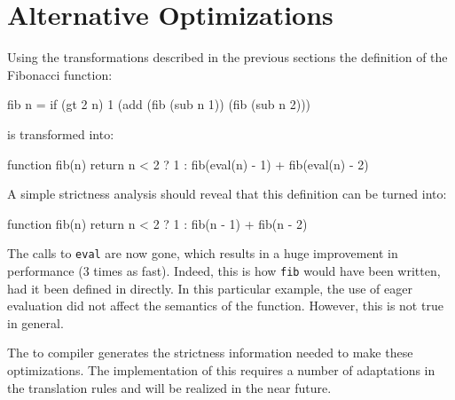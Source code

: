 \section{Alternative Optimizations}\label{sapljs:sec:optimizations}

Using the transformations described in the previous sections the definition
of the Fibonacci function:
\begin{CleanCode}
fib n = if (gt 2 n) 1 (add (fib (sub n 1)) (fib (sub n 2)))
\end{CleanCode} 
is transformed into:
\begin{CleanCode}
function fib(n) {
    return n < 2 ? 1 : fib(eval(n) - 1) + fib(eval(n) - 2)
}
\end{CleanCode}
A simple strictness analysis should reveal that this definition can be turned into:
\begin{CleanCode}
function fib(n) {
    return n < 2 ? 1 : fib(n - 1) + fib(n - 2)
}
\end{CleanCode}
The calls to \texttt{eval} are now gone, which results in a huge improvement in performance (3 times as fast). Indeed,
this is how \texttt{fib} would have been written, had it been defined in \JavaScript
directly. In this particular example, the use of eager evaluation did not affect
the semantics of the function. However, this is not true in general. 

The \Clean to \Sapl compiler generates the strictness information needed to make these 
optimizations. The implementation of this requires a number of adaptations in the translation rules
and will be realized in the near future.

